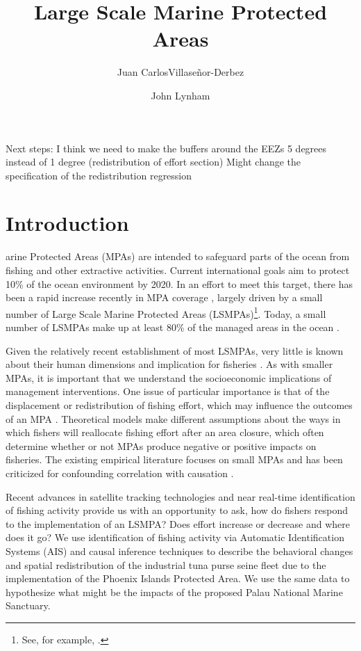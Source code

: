 \documentclass[9pttwoside,lineno]{pnas-new}
\title{Large Scale Marine Protected Areas}
\author[a,1]{Juan CarlosVillase\~{n}or-Derbez}
\author[b,1]{John Lynham}
\affil[a]{Bren School of Environmental Science \& Management, University of California at Santa Barbara, Santa Barbara, CA}
\affil[b]{Department of Economics, University of Hawaii at Manoa, Honolulu, HI}
\begin{document}
\maketitle
\thispagestyle{firststyle}



Next steps: I think we need to make the buffers around the EEZs 5 degrees instead of 1 degree (redistribution of effort section)
Might change the specification of the redistribution regression


\section{Introduction}\label{introduction}
arine Protected Areas (MPAs) are intended to safeguard parts of the
ocean from fishing and other extractive activities. Current
international goals aim to protect 10\% of the ocean environment by
2020. In an effort to meet this target, there has been a rapid
increase recently in MPA coverage \citep{wood_2008,sala_2018}, largely driven by
a small number of Large Scale Marine Protected Areas (LSMPAs)\footnote{See, for example, \citep{game_2009,singleton_2014,boonzaier_2016,mccauley_2016,alger_2017}.}.
Today, a small number of LSMPAs make up at least 80\%
of the managed areas in the ocean \citep{toonen_2013}.

Given the relatively recent establishment of most LSMPAs, very little is
known about their human dimensions and implication for fisheries
\citep{gray_2017}. As with smaller MPAs, it is important that we
understand the socioeconomic implications of management interventions.
One issue of particular importance is that of the displacement or
redistribution of fishing effort, which may influence the outcomes of an
MPA \citep{smith_2003}. Theoretical models make different assumptions
about the ways in which fishers will reallocate fishing effort after an
area closure, which often determine whether or not MPAs produce negative or positive impacts on fisheries. The existing empirical literature focuses on small MPAs and has been criticized for confounding correlation with causation \citep{ferraro2018causal}.

Recent advances in satellite tracking technologies and near real-time
identification of fishing activity provide us with an opportunity to ask, how do fishers respond to the implementation of an LSMPA? Does effort increase or decrease and where does it go? We use identification of fishing activity via Automatic
Identification Systems (AIS) and causal inference techniques to describe
the behavioral changes and spatial redistribution of the industrial tuna
purse seine fleet due to the implementation of the Phoenix Islands Protected Area. We use the same data to hypothesize what might be the impacts of the proposed Palau National Marine Sanctuary.
\end{document}
